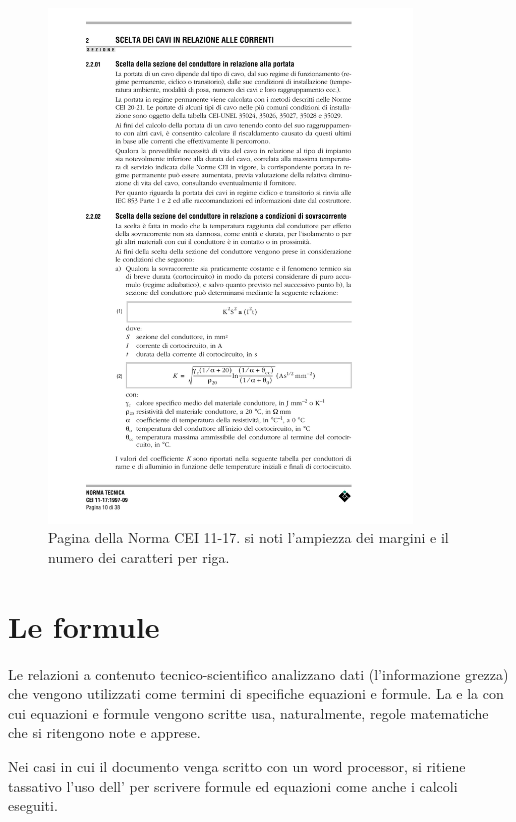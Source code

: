 \begin{figure}[htb!]
\centering
    \includegraphics[width=0.86\textwidth]{figure/cei_11-17.pdf}%
    \caption[Pagina di esempio della Norma CEI 11-17.]{Pagina della Norma CEI 11-17. si noti l'ampiezza dei margini e il numero dei caratteri per riga.}
    \label{fig:cei11-17}
\end{figure}


						\section{Le formule}

Le relazioni a contenuto tecnico-scientifico analizzano dati (l'informazione grezza) che vengono utilizzati come termini di specifiche equazioni e formule. La  e la  con cui equazioni e formule vengono scritte usa, naturalmente, regole matematiche che si ritengono note e apprese.

Nei casi in cui il documento venga scritto con un word processor, si ritiene tassativo l'uso dell' per scrivere formule ed equazioni come anche i calcoli eseguiti.

